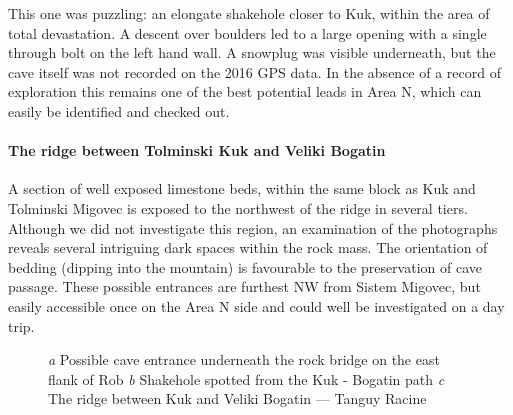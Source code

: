 This one was puzzling: an elongate shakehole closer to Kuk, within the area of total devastation. A descent over boulders led to a large opening with a single through bolt on the left hand wall. A snowplug was visible underneath, but the cave itself was not recorded on the 2016 GPS data. In the absence of a record of exploration this remains one of the best potential leads in Area N, which can easily be identified and checked out.

\paragraph{The ridge between Tolminski Kuk and Veliki Bogatin}

A section of well exposed limestone beds, within the same block as Kuk and Tolminski Migovec is exposed to the northwest of the ridge in several tiers. Although we did not investigate this region, an examination of the photographs reveals several intriguing dark spaces within the rock mass. The orientation of bedding (dipping into the mountain) is favourable to the preservation of cave passage.  These possible entrances are furthest NW from Sistem Migovec, but easily accessible once on the Area N side and could well be investigated on a day trip.

\begin{figure*}[t!]
\checkoddpage \ifoddpage \forcerectofloat \else \forceversofloat \fi
\centering
    \begin{subfigure}[t]{0.454\textwidth}
        \centering
        
        \caption{} \label{rockbridge}
    \end{subfigure}
        \hfill
\begin{subfigure}[t]{0.536\textwidth}
\centering
{} 
 \caption{}\label{shakehole next to kuk}
\end{subfigure}
    \vspace{0cm}
    \begin{subfigure}[t]{\textwidth}
    \centering
       
        \caption{} \label{ridge west}
    \end{subfigure}
    \caption{
    \emph{a} Possible cave entrance underneath the rock bridge on the east flank of Rob  
     \emph{b} Shakehole spotted from the Kuk - Bogatin path
     \emph{c} The ridge between Kuk and Veliki Bogatin --- Tanguy Racine }
\end{figure*}


